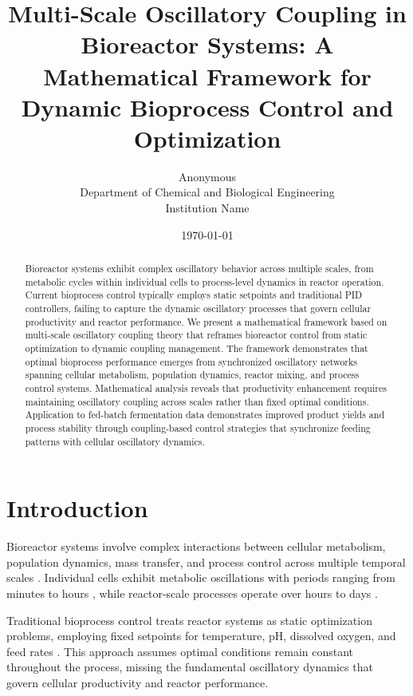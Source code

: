 \documentclass[twocolumn]{article}
\title{Multi-Scale Oscillatory Coupling in Bioreactor Systems: A Mathematical Framework for Dynamic Bioprocess Control and Optimization}
\author{
Anonymous\\
Department of Chemical and Biological Engineering\\
Institution Name
}
\date{\today}
\begin{document}
\maketitle

\begin{abstract}
Bioreactor systems exhibit complex oscillatory behavior across multiple scales, from metabolic cycles within individual cells to process-level dynamics in reactor operation. Current bioprocess control typically employs static setpoints and traditional PID controllers, failing to capture the dynamic oscillatory processes that govern cellular productivity and reactor performance. We present a mathematical framework based on multi-scale oscillatory coupling theory that reframes bioreactor control from static optimization to dynamic coupling management. The framework demonstrates that optimal bioprocess performance emerges from synchronized oscillatory networks spanning cellular metabolism, population dynamics, reactor mixing, and process control systems. Mathematical analysis reveals that productivity enhancement requires maintaining oscillatory coupling across scales rather than fixed optimal conditions. Application to fed-batch fermentation data demonstrates improved product yields and process stability through coupling-based control strategies that synchronize feeding patterns with cellular oscillatory dynamics.
\end{abstract}

\section{Introduction}

Bioreactor systems involve complex interactions between cellular metabolism, population dynamics, mass transfer, and process control across multiple temporal scales \citep{doran2013bioprocess,shuler2017bioprocess}. Individual cells exhibit metabolic oscillations with periods ranging from minutes to hours \citep{murray2007temporal,danø2001sustained}, while reactor-scale processes operate over hours to days \citep{stephanopoulos1998metabolic}.

Traditional bioprocess control treats reactor systems as static optimization problems, employing fixed setpoints for temperature, pH, dissolved oxygen, and feed rates \citep{lee2015fundamentals,mandenius2016bioprocess}. This approach assumes optimal conditions remain constant throughout the process, missing the fundamental oscillatory dynamics that govern cellular productivity and reactor performance.
\end{document}
